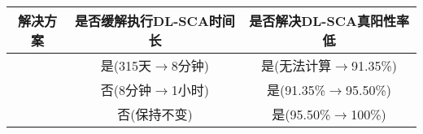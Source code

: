 {{{		\begin{table}[!h]
			\label{tab:solution2problem}
			\centering
			\footnotesize
			\begin{tabular}{c|cc}
				\hline
				解决方案&是否缓解执行DL-SCA时间长&是否解决DL-SCA真阳性率低\\
				\hline
				\yuchuli&是(315天$\rightarrow$8分钟)&是(无法计算$\rightarrow$91.35\%)\\
				\shujuzengqiang&否(8分钟$\rightarrow$1小时)&是(91.35\%$\rightarrow$95.50\%)\\
				\jiashejianyanguji&否(保持不变)&是(95.50\%$\rightarrow$100\%)\\
				\hline
			\end{tabular}
		\end{table}
		
	}
{

}}}
